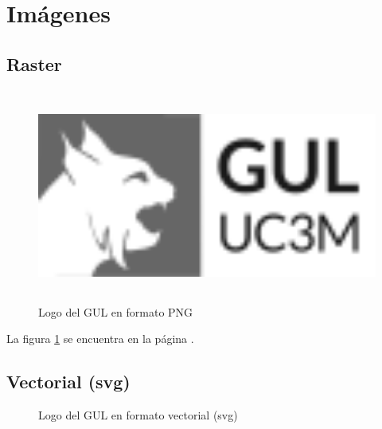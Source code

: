 \section{Imágenes}

\subsection{Raster}

\begin{figure}[ht]
    \centering
    \includegraphics[height=7cm]{recursos/gul_logo_raster.png}
    \caption{Logo del GUL en formato PNG}
    \label{fig:logo1}
\end{figure}

La figura \ref{fig:logo1} se encuentra en la página \pageref{fig:logo1}.

\newpage


\subsection{Vectorial (svg)}

\begin{figure}[ht]
     
     \centering
     \caption{Logo del GUL en formato vectorial (svg)}
     \label{fig:logo2}
\end{figure}
